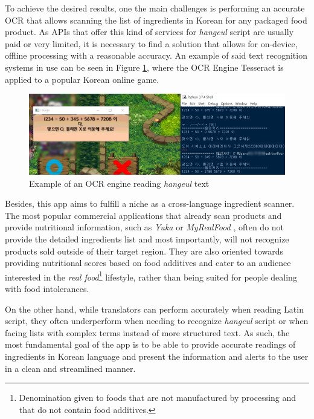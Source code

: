 To achieve the desired results, one the main challenges is performing an accurate OCR that allows scanning the list of ingredients in Korean for any packaged food product. As APIs that offer this kind of services for \textit{hangeul} script are usually paid or very limited, it is necessary to find a solution that allows for on-device, offline processing with a reasonable accuracy. An example of said text recognition systems in use can be seen in Figure \ref{fig:maplestory}, where the OCR Engine Tesseract \cite{noauthor_tesseract_2021} is applied to a popular Korean online game.

\begin{figure}[h]
  \centering
  \includegraphics[width=\textwidth]{Figures/maplestory.png}
  \caption{%
    Example of an OCR engine reading \textit{hangeul} text
  }
  \label{fig:maplestory}
\end{figure}

Besides, this app aims to fulfill a niche as a cross-language ingredient scanner. The most popular commercial applications that already scan products and provide nutritional information, such as \textit{Yuka} \cite{noauthor_yuka_nodate-1} or \textit{MyRealFood} \cite{sl_myrealfood_nodate}, often do not provide the detailed ingredients list and most importantly, will not recognize products sold outside of their target region. They are also oriented towards providing nutritional scores based on food additives and cater to an audience interested in the \textit{real food}\footnote{Denomination given to foods that are not manufactured by processing and that do not contain food additives.} lifestyle, rather than being suited for people dealing with food intolerances.

On the other hand, while translators can perform accurately when reading Latin script, they often underperform when needing to recognize \textit{hangeul} script or when facing lists with complex terms instead of more structured text. As such, the most fundamental goal of the app is to be able to provide accurate readings of ingredients in Korean language and present the information and alerts to the user in a clean and streamlined manner.

